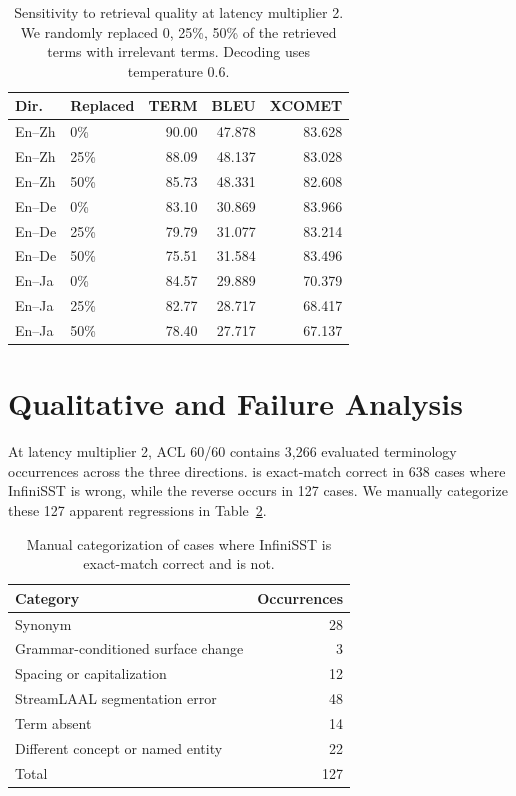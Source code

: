 \begin{table}[t]
\centering
\setlength{\tabcolsep}{2.5pt}
\begin{tabular}{llrrr}
\toprule
Dir. & Replaced & TERM & BLEU & XCOMET \\
\midrule
En--Zh & 0\%  & 90.00 & 47.878 & 83.628 \\
En--Zh & 25\% & 88.09 & 48.137 & 83.028 \\
En--Zh & 50\% & 85.73 & 48.331 & 82.608 \\
\midrule
En--De & 0\%  & 83.10 & 30.869 & 83.966 \\
En--De & 25\% & 79.79 & 31.077 & 83.214 \\
En--De & 50\% & 75.51 & 31.584 & 83.496 \\
\midrule
En--Ja & 0\%  & 84.57 & 29.889 & 70.379 \\
En--Ja & 25\% & 82.77 & 28.717 & 68.417 \\
En--Ja & 50\% & 78.40 & 27.717 & 67.137 \\
\bottomrule
\end{tabular}
\caption{Sensitivity to retrieval quality at latency multiplier 2. We randomly replaced 0, 25\%, 50\% of the retrieved terms with irrelevant terms. Decoding uses temperature 0.6.}
\label{tab:retrieval_degradation}
\end{table}


\section{\texorpdfstring{{Qualitative and Failure Analysis}}{Qualitative and Failure Analysis}}
\label{sec:qualitative_analysis}

At latency multiplier 2, ACL 60/60 contains 3,266 evaluated terminology occurrences across the three directions. \method is exact-match correct in 638 cases where InfiniSST is wrong, while the reverse occurs in 127 cases. We manually categorize these 127 apparent regressions in Table~\ref{tab:qualitative_errors}.

\begin{table}[t]
\centering
\small
\begin{tabular}{lr}
\toprule
Category & Occurrences \\
\midrule
Synonym & 28 \\
Grammar-conditioned surface change & 3 \\
Spacing or capitalization & 12 \\
StreamLAAL segmentation error & 48 \\
Term absent & 14 \\
Different concept or named entity & 22 \\
\midrule
Total & 127 \\
\bottomrule
\end{tabular}
\caption{Manual categorization of cases where InfiniSST is exact-match correct and \method is not.}
\label{tab:qualitative_errors}
\end{table}

